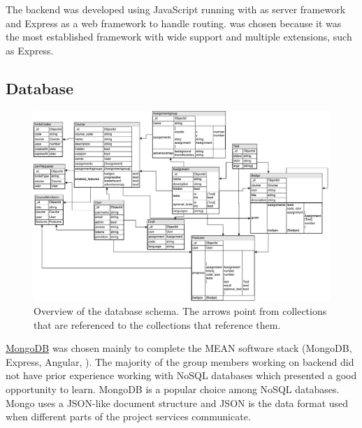 
The backend was developed using JavaScript running with \nodejs{} as server framework and Express as a web framework to handle routing. \nodejs{} was chosen because it was the most established framework with wide support and multiple extensions, such as Express.

\subsection{Database} \label{database}


\begin{figure}
    \centering
    \includegraphics[width=\textwidth]{img/gpp_database-schema.pdf}
    \caption{Overview of the database schema. The arrows point from collections that are referenced to the collections that reference them.}
    \label{fig:schema}
\end{figure}
		
\href{https://www.mongodb.com}{MongoDB} was chosen mainly to complete the MEAN software stack (MongoDB, Express, Angular, \nodejs{}). The majority of the group members working on backend did not have prior experience working with NoSQL databases which presented a good opportunity to learn. MongoDB is a popular choice among NoSQL databases. Mongo uses a JSON-like document structure and JSON is the data format used when different parts of the project services communicate.

